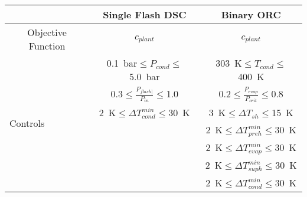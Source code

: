\begin{tabular}{|c | c c |}
    \hline
    \rowcolor{bluepoli!40} %
      & \textbf{Single Flash DSC} & \textbf{Binary ORC} \T\B \\
    \hline \hline
    Objective Function & \(c_{plant}\) & \(c_{plant}\) \T\B \\
    \hline
    \multicolumn{1}{|l|}{\multirow{7}{*}{Controls}} & \qty{0.1}{\bar}\(\leq P_{cond}\leq\)\qty{5.0}{\bar} & \qty{303}{\K}\(\leq T_{cond}\leq\)\qty{400}{\K} \T\B \\
    \multicolumn{1}{|l|}{} & \num{0.3}\(\leq \frac{P_{flash]}}{P_{in}}\leq\)\num{1.0} & \num{0.2}\(\leq \frac{P_{evap}}{P_{crit}}\leq\)\num{0.8} \T\B \\
    \multicolumn{1}{|l|}{} & \qty{2}{\K}\(\leq \Delta T_{cond}^{min}\leq\)\qty{30}{\K} & \qty{3}{\K}\(\leq \Delta T_{sh}\leq\)\qty{15}{\K} \T\B \\
    \multicolumn{1}{|l|}{} &  & \qty{2}{\K}\(\leq \Delta T_{preh}^{min}\leq\)\qty{30}{\K} \T\B \\
    \multicolumn{1}{|l|}{} &  & \qty{2}{\K}\(\leq \Delta T_{evap}^{min}\leq\)\qty{30}{\K} \T\B \\
    \multicolumn{1}{|l|}{} &  & \qty{2}{\K}\(\leq \Delta T_{suph}^{min}\leq\)\qty{30}{\K} \T\B \\
    \multicolumn{1}{|l|}{} &  & \qty{2}{\K}\(\leq \Delta T_{cond}^{min}\leq\)\qty{30}{\K} \T\B \\
    \hline
\end{tabular}